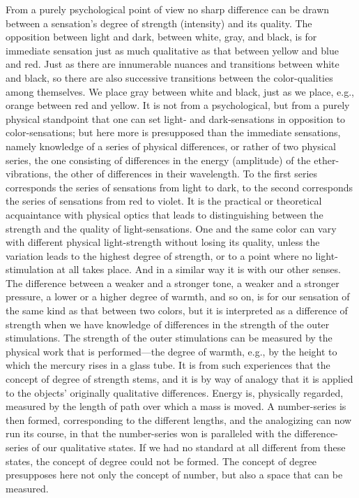 \documentclass[12pt,a4paper]{book}
\newcommand{\opage}[1]{\marginnote{\footnotesize\textit{[#1]}}}
\begin{document}
\opage{194}From a purely psychological point of view no sharp difference can be drawn
between a sensation's degree of strength (intensity) and its quality. The
opposition between light and dark, between white, gray, and black, is for
immediate sensation just as much qualitative as that between yellow and blue
and red. Just as there are innumerable nuances and transitions between white
and black, so there are also successive transitions between the
color-qualities among themselves. We place gray between white and black, just
as we place, e.g., orange between red and yellow. It is not from a
psychological, but from a purely physical standpoint that one can set light- and dark-sensations in opposition to color-sensations; but here more
is presupposed than the immediate sensations, namely knowledge of a series of
physical differences, or rather of two physical series, the one consisting of
differences in the energy (amplitude) of the ether-vibrations, the other of
differences in their wavelength. To the first series corresponds the series
of sensations from light to dark, to the second corresponds the series of
sensations from red to violet. It is the practical or theoretical
acquaintance with physical optics that leads to distinguishing between the
strength and the quality of light-sensations. One and the same color can vary
with different physical light-strength without losing its quality, unless the
variation leads to the highest degree of strength, or to a point where no
light-stimulation at all takes place. And in a similar way it is with our
other senses. The difference between a weaker and a stronger tone, a weaker
and a stronger pressure, a lower or a higher degree of warmth, and so on, is
for our sensation of the same kind as that between two colors, but it is
interpreted as a difference of strength when we have knowledge of differences
in the strength of the outer stimulations. The strength of the outer
stimulations can be measured by the physical work that is performed---the
degree of warmth, e.g., by the height to which the mercury rises in a glass
tube. It is from such experiences that the concept of degree of strength
stems, and it is by way of analogy that it is applied to the objects'
originally qualitative differences. Energy is, physically regarded, \opage{195}measured
by the length of path over which a mass is moved. A number-series is then
formed, corresponding to the different lengths, and the analogizing can now
run its course, in that the number-series won is paralleled with the
difference-series of our qualitative states. If we had no standard at all
different from these states, the concept of degree could not be formed. The
concept of degree presupposes here not only the concept of number, but also a
space that can be measured.
\end{document}
